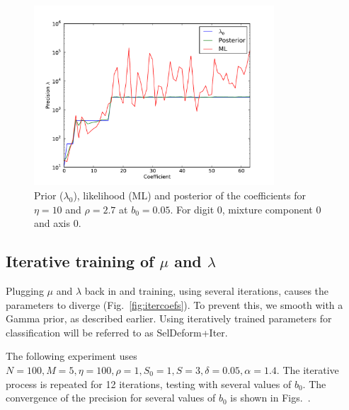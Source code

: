 \documentclass{report}
\begin{document}
\begin{figure}
    \centering
    \includegraphics[width=0.8\textwidth]{figs/plotb000-eta10-rho2-7.pdf}
    \caption{Prior ($\lambda_0$), likelihood (ML) and posterior of the coefficients for $\eta=10$ and $\rho=2.7$ at $b_0 = 0.05$. For digit 0, mixture component 0 and axis 0.} \label{fig:rho27}
\end{figure}


\subsection{Iterative training of $\mu$ and $\lambda$}
Plugging $\mu$ and $\lambda$ back in and training, using several iterations, causes the parameters to diverge (Fig.~\ref{fig:itercoefs}). To prevent this, we smooth with a Gamma prior, as described earlier. Using iteratively trained parameters for classification will be referred to as SelDeform+Iter.

The following experiment uses $N=100, M=5, \eta=100, \rho=1, S_0=1, S=3, \delta=0.05, \alpha=1.4$. The iterative process is repeated for 12 iterations, testing with several values of $b_0$. The convergence of the precision for several values of $b_0$ is shown in Figs.~.
\end{document}
